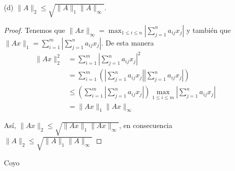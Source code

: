 \begin{enumerate}
\begin{proof}
    \end{proof}
    \item[(d)] $\|A\|_2 \leq \sqrt{\|A\|_1 \|A\|_\infty}.$
    \begin{proof}
    Tenemos que $\|Ax\|_\infty = \max_{1 \leq i \leq n}{\left|\sum_{j=1}^{n}a_{ij}x_j\right|}$ y también que $\|Ax\|_1 = \sum_{i=1}^m\left|\sum_{j=1}^{n}a_{ij}x_{j}\right|$. De esta manera
    \begin{align*}
    \|Ax\|_2^2 & = \sum_{i=1}^m\left|\sum_{j=1}^{n}a_{ij}x_{j}\right|^2 \\ 
    & = \sum_{i=1}^m\left(\left|\sum_{j=1}^{n}a_{ij}x_{j}\right|\left|\sum_{j=1}^{n}a_{ij}x_{j}\right|\right) \\ 
    &\leq \left(\sum_{i=1}^m\left|\sum_{j=1}^{n}a_{ij}x_{j}\right|\right)\max_{1\leq i \leq m}{\left|\sum_{j=1}^{n}a_{ij}x_{j}\right|} \\ 
    & = \|Ax\|_1 \|Ax\|_\infty
    \end{align*}

    Así, $\|Ax\|_2\leq \sqrt{\|Ax\|_1 \|Ax\|_\infty}$, en consecuencia $\|A\|_2 \leq \sqrt{\|A\|_1 \|A\|_\infty}$
    \end{proof}
    Coyo
\end{enumerate}